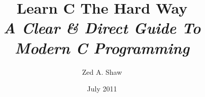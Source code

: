 


\title{
    Learn C The Hard Way\\
    \textit{A Clear \& Direct Guide To Modern C Programming}
}
\author{Zed A. Shaw}
\date{July 2011}



\frontmatter

\maketitle

\tableofcontents


\mainmatter


























































\appendix



